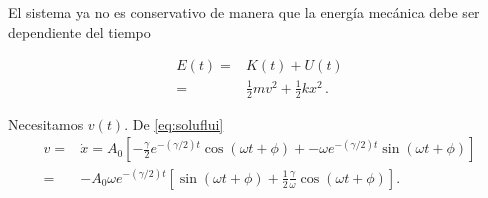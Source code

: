 
El sistema ya no es conservativo de manera que la energía mecánica debe ser dependiente del tiempo

\begin{align*}
  E(t)=&K(t)+U(t)\nonumber\\
=&\tfrac{1}{2}m v^2+\tfrac{1}{2}k x^2\,.
\end{align*}

Necesitamos $v(t)$. De \eqref{eq:soluflui}
\begin{align*}
  v=&\dot{x}=A_0 \left[-\frac{\gamma}{2}e^{-(\gamma/2)t}\cos(\omega t+\phi)+
            -\omega e^{-(\gamma/2)t}\sin(\omega t+\phi)\right]\nonumber\\
=&-A_0 \omega e^{-(\gamma/2)t} \left[\sin(\omega t+\phi)+\frac{1}{2}\frac{\gamma}{\omega}\cos(\omega t+\phi)\right].
\end{align*}

